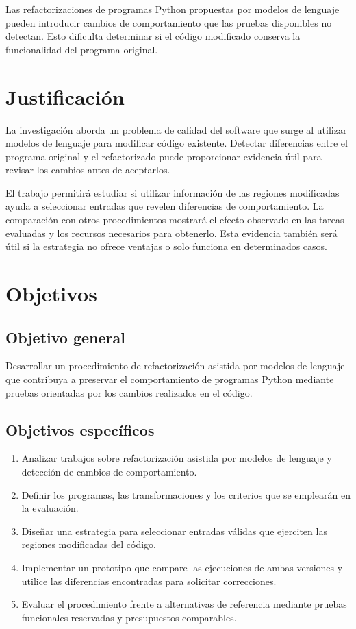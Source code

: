 \documentclass[11pt,openright,final]{unsa}
\begin{document}
Las refactorizaciones de programas Python propuestas por modelos de lenguaje pueden introducir cambios de comportamiento que las pruebas disponibles no detectan. Esto dificulta determinar si el código modificado conserva la funcionalidad del programa original.

\section{Justificación}

La investigación aborda un problema de calidad del software que surge al utilizar modelos de lenguaje para modificar código existente. Detectar diferencias entre el programa original y el refactorizado puede proporcionar evidencia útil para revisar los cambios antes de aceptarlos.

El trabajo permitirá estudiar si utilizar información de las regiones modificadas ayuda a seleccionar entradas que revelen diferencias de comportamiento. La comparación con otros procedimientos mostrará el efecto observado en las tareas evaluadas y los recursos necesarios para obtenerlo. Esta evidencia también será útil si la estrategia no ofrece ventajas o solo funciona en determinados casos.

\section{Objetivos}

\subsection{Objetivo general}

Desarrollar un procedimiento de refactorización asistida por modelos de lenguaje que contribuya a preservar el comportamiento de programas Python mediante pruebas orientadas por los cambios realizados en el código.

\subsection{Objetivos específicos}

\begin{enumerate}
\item Analizar trabajos sobre refactorización asistida por modelos de lenguaje y detección de cambios de comportamiento.
\item Definir los programas, las transformaciones y los criterios que se emplearán en la evaluación.
\item Diseñar una estrategia para seleccionar entradas válidas que ejerciten las regiones modificadas del código.
\item Implementar un prototipo que compare las ejecuciones de ambas versiones y utilice las diferencias encontradas para solicitar correcciones.
\item Evaluar el procedimiento frente a alternativas de referencia mediante pruebas funcionales reservadas y presupuestos comparables.
\end{enumerate}
\end{document}
